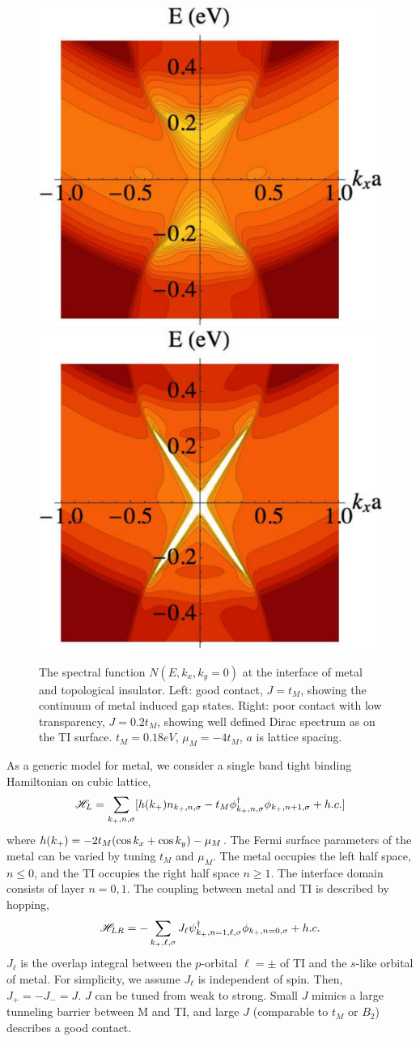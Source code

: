 \begin{figure}
\center
\includegraphics[width=.45\textwidth]{include/j1.pdf}\includegraphics[width=.45\textwidth]{include/j2.pdf}
\caption{The spectral function $N(E,k_x,k_y=0)$ at the interface of metal and topological insulator. Left: 
good contact, $J=t_M$, showing the continuum of metal induced gap states. 
Right: poor contact with low transparency, $J=0.2t_M$, showing well 
defined Dirac spectrum as on the TI surface. $t_M=0.18eV$, $\mu_M=-4t_M$, $a$ is lattice spacing.}
\end{figure}
 
As a generic model for metal, we consider a single band tight binding Hamiltonian on cubic lattice,
\[
\mathscr{H}_L=\sum_{k_{+},n,\sigma}[h({k_{+}})  n_{k_{+},n,\sigma}
- t_M \phi_{k_{+},n,\sigma}^\dagger  \phi_{k_{+},n+1,\sigma} + h.c.] 
\]
where $h(k_{+})=-2t_M(\cos k_x+\cos k_y)-\mu_M$. 
The Fermi surface parameters of the metal can be varied by tuning $t_M$ and $\mu_M$.
The metal occupies the left half space, $n\leq 0$, and 
the TI occupies the right half space $n\geq 1$. The interface domain consists of layer $n=0,1$. 
The coupling between metal and TI is described by hopping,
\[
\mathscr{H}_{LR}=-\sum_{k_{+},\ell,\sigma}J_{\ell}\psi^{\dagger}_{k_{+},n=1,\ell,\sigma}\phi_{k_{+},n=0,\sigma}+h.c.
\]
$J_{\ell}$ is the overlap integral between the $p$-orbital $\ell=\pm$ of TI and the $s$-like orbital of metal. For simplicity, we assume $J_{\ell}$ is independent of spin. Then, $J_{+}=-J_{-}=J$. $J$ can be tuned from weak to strong. Small $J$ mimics a large tunneling barrier between M and TI, 
and large $J$ (comparable to $t_M$ or $B_2$) describes a good contact. 

